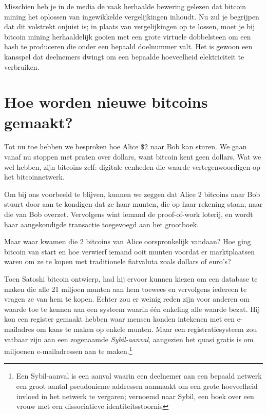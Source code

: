 Misschien heb je in de media de vaak herhaalde bewering gelezen dat bitcoin mining het oplossen van ingewikkelde vergelijkingen inhoudt. Nu zul je begrijpen dat dit volstrekt onjuist is; in plaats van vergelijkingen op te lossen, moet je bij bitcoin mining herhaaldelijk gooien met een grote virtuele dobbelsteen om een hash te produceren die onder een bepaald doelnummer valt. Het is gewoon een kansspel dat deelnemers dwingt om een bepaalde hoeveelheid elektriciteit te verbruiken.

\section{Hoe worden nieuwe bitcoins gemaakt?}

Tot nu toe hebben we besproken hoe Alice \$2 naar Bob kan sturen. We gaan vanaf nu stoppen met praten over dollars, want bitcoin kent geen dollars. Wat we wel hebben, zijn bitcoins zelf: digitale eenheden die waarde vertegenwoordigen op het bitcoinnetwerk.

Om bij ons voorbeeld te blijven, kunnen we zeggen dat Alice 2 bitcoins naar Bob stuurt door aan te kondigen dat ze haar munten, die op haar \textquotedbl{}rekening\textquotedbl{} staan, naar die van Bob overzet. Vervolgens wint iemand de proof-of-work loterij, en wordt haar aangekondigde transactie toegevoegd aan het grootboek.

Maar waar kwamen die 2 bitcoins van Alice oorspronkelijk vandaan? Hoe ging bitcoin van start en hoe verwierf iemand ooit munten voordat er marktplaatsen waren om ze te kopen met traditionele fiatvaluta zoals dollars of euro’s?

Toen Satoshi bitcoin ontwierp, had hij ervoor kunnen kiezen om een database te maken die alle 21 miljoen munten aan hem toewees en vervolgens iedereen te vragen ze van hem te kopen. Echter zou er weinig reden zijn voor anderen om waarde toe te kennen aan een systeem waarin één enkeling alle waarde bezat. Hij kon een register gemaakt hebben waar mensen konden intekenen met een e-mailadres om kans te maken op enkele munten. Maar een registratiesysteem zou vatbaar zijn aan een zogenaamde \textit{Sybil-aanval}, aangezien het quasi gratis is om miljoenen e-mailadressen aan te maken.\footnote{Een Sybil-aanval is een aanval waarin een deelnemer aan een bepaald netwerk een groot aantal pseudonieme addressen aanmaakt om een grote hoeveelheid invloed in het netwerk te vergaren; vernoemd naar Sybil, een boek over een vrouw met een dissociatieve identiteitsstoornis}

